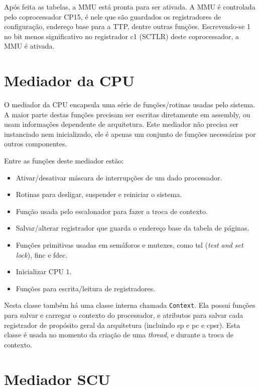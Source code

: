 Após feita as tabelas, a MMU está pronta para ser ativada. A MMU é controlada pelo coprocessador CP15, é nele que são guardados os registradores de configuração, endereço base para a TTP, dentre outras funções. Escrevendo-se 1 no bit menos significativo no registrador c1 (SCTLR) deste coprocessador, a MMU é ativada.


\section{Mediador da CPU}

O mediador da CPU encapsula uma série de funções/rotinas usadas pelo sistema. A maior parte destas funções precisam ser escritas diretamente em assembly, ou usam informações dependente de arquitetura. Este mediador não precisa ser instanciado nem inicializado, ele é apenas um conjunto de funções necessárias por outros componentes.

Entre as funções deste mediador estão:

\begin{itemize}

\item Ativar/desativar máscara de interrupções de um dado processador.
\item Rotinas para desligar, suspender e reiniciar o sistema.
\item Função usada pelo escalonador para fazer a troca de contexto.
\item Salvar/alterar registrador que guarda o endereço base da tabela de páginas.
\item Funções primitivas usadas em semáforos e mutexes, como tsl (\emph{test and set lock}), finc e fdec.
\item Inicializar CPU 1.
\item Funções para escrita/leitura de registradores.

\end{itemize}


Nesta classe também há uma classe interna chamada \verb+Context+. Ela possui funções para salvar e carregar o contexto do processador, e atributos para salvar cada registrador de propósito geral da arquitetura (incluindo sp e pc e cpsr). Esta classe é usada no momento da criação de uma \emph{thread}, e durante a troca de contexto.



\section{Mediador SCU}


